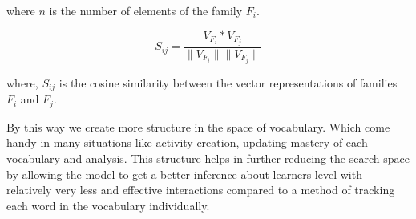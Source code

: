 \documentclass[11pt,a4paper]{article}
\begin{document}
where ${n}$ is the number of elements of the family ${F_i}$.

\begin{equation}
  S_{ij} = \frac{V_{F_i} * V_{F_j}}{\|V_{F_i}\|  \|V_{F_j}\|}
\end{equation}

where, ${S_{ij}}$ is the cosine similarity between the vector representations of
families ${F_i}$ and ${F_j}$.


By this way we create more structure in the space of vocabulary. Which come
handy in many situations like activity creation, updating mastery of each
vocabulary and analysis. This structure helps in further reducing the search space
by allowing the model to get a better inference about learners level with
relatively very less and effective interactions compared to a method of
tracking each word in the vocabulary individually.
\end{document}
